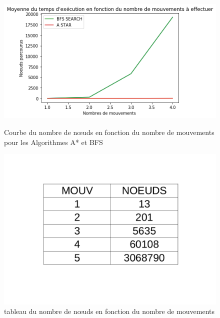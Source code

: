 \documentclass[a4paper]{article} %
\begin{document}
\begin{figure}[h]
	\begin{center}
	\includegraphics[scale=0.37]{./images/node.png}
	\caption{Courbe du nombre de nœuds en fonction du  nombre de mouvements pour les Algorithmes A* et BFS
	 }
	\end{center}
	\begin{center}
	\includegraphics[scale=0.14]{./images/tabBFS.png}
	\caption{tableau du nombre de nœuds en fonction du  nombre de mouvements}
	\end{center}
\end{figure}
\end{document}
